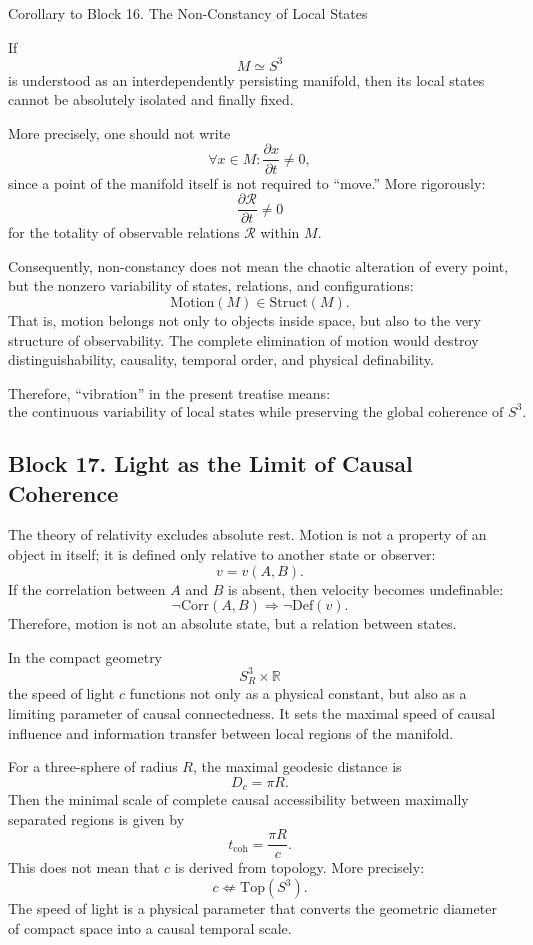 \documentclass[12pt,a4paper]{article}
\theoremstyle{definition}
\begin{document}
Corollary to Block 16. The Non-Constancy of Local States

If
\[
M\simeq S^3
\]
is understood as an interdependently persisting manifold, then its local states cannot be absolutely isolated and finally fixed.

More precisely, one should not write
\[
\forall x\in M:\frac{\partial x}{\partial t}\neq 0,
\]
since a point of the manifold itself is not required to ``move.'' More rigorously:
\[
\frac{\partial \mathcal R}{\partial t}\neq 0
\]
for the totality of observable relations \(\mathcal R\) within \(M\).

Consequently, non-constancy does not mean the chaotic alteration of every point, but the nonzero variability of states, relations, and configurations:
\[
\mathrm{Motion}(M)\in \mathrm{Struct}(M).
\]
That is, motion belongs not only to objects inside space, but also to the very structure of observability. The complete elimination of motion would destroy distinguishability, causality, temporal order, and physical definability.

Therefore, ``vibration'' in the present treatise means:
\[
\text{the continuous variability of local states while preserving the global coherence of } S^3.
\]
\subsection{Block 17. Light as the Limit of Causal Coherence}
The theory of relativity excludes absolute rest. Motion is not a property of an object in itself; it is defined only relative to another state or observer:
\[
v=v(A,B).
\]
If the correlation between \(A\) and \(B\) is absent, then velocity becomes undefinable:
\[
\neg\mathrm{Corr}(A,B)\Rightarrow \neg\mathrm{Def}(v).
\]
Therefore, motion is not an absolute state, but a relation between states.

In the compact geometry
\[
S^3_R\times \mathbb R
\]
the speed of light \(c\) functions not only as a physical constant, but also as a limiting parameter of causal connectedness. It sets the maximal speed of causal influence and information transfer between local regions of the manifold.

For a three-sphere of radius \(R\), the maximal geodesic distance is
\[
D_c=\pi R.
\]
Then the minimal scale of complete causal accessibility between maximally separated regions is given by
\[
t_{\mathrm{coh}}=\frac{\pi R}{c}.
\]
This does not mean that \(c\) is derived from topology. More precisely:
\[
c\not\Leftarrow \mathrm{Top}(S^3).
\]
The speed of light is a physical parameter that converts the geometric diameter of compact space into a causal temporal scale.
\end{document}
